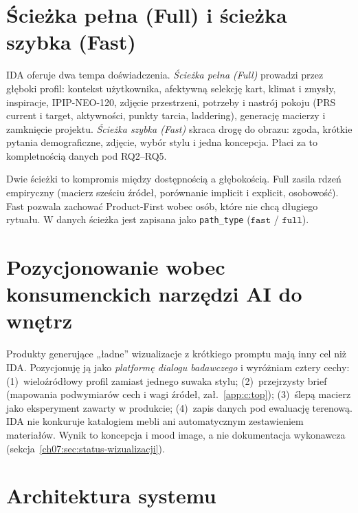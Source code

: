 \section{Ścieżka pełna (Full) i ścieżka szybka (Fast)}
\label{ch07:sec:sciezki}

IDA oferuje dwa tempa doświadczenia. \emph{Ścieżka pełna (Full)} prowadzi przez głęboki profil: kontekst użytkownika, afektywną selekcję kart, klimat i zmysły, inspiracje, IPIP-NEO-120, zdjęcie przestrzeni, potrzeby i nastrój pokoju (PRS current i target, aktywności, punkty tarcia, laddering), generację macierzy i zamknięcie projektu.
\emph{Ścieżka szybka (Fast)} skraca drogę do obrazu: zgoda, krótkie pytania demograficzne, zdjęcie, wybór stylu i jedna koncepcja. Płaci za to kompletnością danych pod RQ2--RQ5.

Dwie ścieżki to kompromis między dostępnością a głębokością. Full zasila rdzeń empiryczny (macierz sześciu źródeł, porównanie implicit i explicit, osobowość). Fast pozwala zachować Product-First wobec osób, które nie chcą długiego rytuału. W danych ścieżka jest zapisana jako \texttt{path\_type} ($\mathtt{fast}$ / $\mathtt{full}$).

\section{Pozycjonowanie wobec konsumenckich narzędzi AI do wnętrz}
\label{ch07:sec:pozycjonowanie}

Produkty generujące „ładne” wizualizacje z krótkiego promptu mają inny cel niż IDA. Pozycjonuję ją jako \emph{platformę dialogu badawczego} i wyróżniam cztery cechy: (1)~wieloźródłowy profil zamiast jednego suwaka stylu; (2)~przejrzysty brief (mapowania podwymiarów cech i wagi źródeł, zał.~\ref{app:c:top}); (3)~ślepą macierz jako eksperyment zawarty w produkcie; (4)~zapis danych pod ewaluację terenową.
IDA nie konkuruje katalogiem mebli ani automatycznym zestawieniem materiałów. Wynik to koncepcja i mood image, a nie dokumentacja wykonawcza (sekcja~\ref{ch07:sec:status-wizualizacji}).

\section{Architektura systemu}
\label{ch07:sec:architektura}

